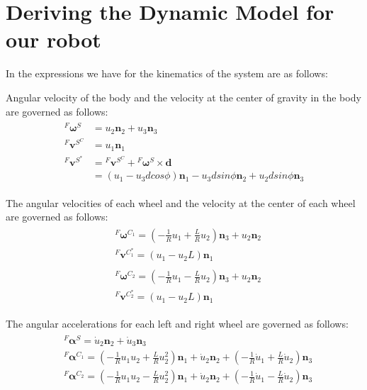 \documentclass[a4paper,10pt]{article}
\begin{document}
\section{Deriving the Dynamic Model for our robot}

In \cite{kim2005dynamic} the expressions we have for the kinematics of the system are as follows:

Angular velocity of the body and the velocity at the center of gravity in the body are governed as follows:
\begin{align} \label{eq:kinem1} \begin{split}
 {}^F\mathbf{\omega}^S &= u_2\mathbf{n}_2 + u_3\mathbf{n}_3 \\
 {}^F\mathbf{v}^{S^C} &= u_1\mathbf{n}_1  \\
 {}^F\mathbf{v}^{S^*} &= {}^F\mathbf{v}^{S^C} + {}^F\mathbf{\omega}^S\times \mathbf{d}\\
  &= (u_1-u_3dcos\phi)\mathbf{n}_1 - u_3dsin\phi\mathbf{n}_2 + u_2dsin\phi\mathbf{n}_3  
\end{split} \end{align} 

The angular velocities of each wheel and the velocity at the center of each wheel are governed as follows:
\begin{align} \label{eq:kinem2} \begin{split}
 &{}^F\mathbf{\omega}^{C_1} = \left(-\frac{1}{R}u_1+\frac{L}{R}u_2\right)\mathbf{n}_3+u_2\mathbf{n}_2 \\
 &{}^F\mathbf{v}^{C_1^*} = (u_1-u_2L)\mathbf{n}_1 
\end{split} \end{align}  
\begin{align} \label{eq:kinem3} \begin{split}
 &{}^F\mathbf{\omega}^{C_2} = \left(-\frac{1}{R}u_1-\frac{L}{R}u_2\right)\mathbf{n}_3+u_2\mathbf{n}_2 \\
 &{}^F\mathbf{v}^{C_2^*} = (u_1-u_2L)\mathbf{n}_1 
\end{split} \end{align} 

The angular accelerations for each left and right wheel are governed as follows:
\begin{align} \label{eq:kinem4} \begin{split}
 &{}^F\mathbf{\alpha}^S=\dot{u}_2\mathbf{n}_2+\dot{u}_3\mathbf{n}_3 \\
 &{}^F\mathbf{\alpha}^{C_1}=\left(-\frac{1}{R}u_1u_2+\frac{L}{R}u_2^2\right)\mathbf{n}_1+\dot{u}_2\mathbf{n}_2 + 
 \left(-\frac{1}{R}\dot{u}_1+\frac{L}{R}\dot{u}_2\right)\mathbf{n}_3 \\
 &{}^F\mathbf{\alpha}^{C_2}=\left(-\frac{1}{R}u_1u_2-\frac{L}{R}u_2^2\right)\mathbf{n}_1+\dot{u}_2\mathbf{n}_2 + 
 \left(-\frac{1}{R}\dot{u}_1-\frac{L}{R}\dot{u}_2\right)\mathbf{n}_3 
\end{split} \end{align} 
\end{document}
